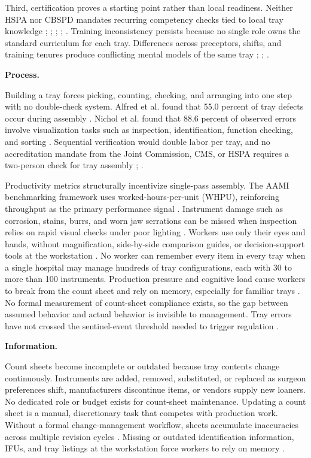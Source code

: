 \documentclass[10pt,a4paper]{article}
\begin{document}
Third, certification proves a starting point rather than local readiness.
Neither HSPA nor CBSPD mandates recurring competency checks tied to local tray
knowledge
\cite{hspa-crcst-accessed-2026};
\cite{ofstead-et-al-2023};
\cite{aorn-staffing-shortage-2025};
\cite{kovach-2012};
\cite{nadeau-2017}. Training inconsistency
persists because no single role owns the standard curriculum for each tray.
Differences across preceptors, shifts, and training tenures produce conflicting
mental models of the same tray
\cite{alfred-et-al-2021};
\cite{hu-et-al-2024};
\cite{thurmond-2020}.

\textbf{Process.}

Building a tray forces picking, counting, checking, and arranging into one step
with no double-check system. Alfred et al. found that 55.0 percent of tray
defects occur during assembly
\cite{alfred-et-al-2021}. Nichol et al. found that
88.6 percent of observed errors involve visualization tasks such as inspection,
identification, function checking, and sorting
\cite{nichol-et-al-2024}. Sequential
verification would double labor per tray, and no accreditation mandate from the
Joint Commission, CMS, or HSPA requires a two-person check for tray assembly
\cite{alfred-et-al-2021};
\cite{chen-et-al-2023}.

Productivity metrics structurally incentivize single-pass assembly. The AAMI
benchmarking framework uses worked-hours-per-unit (WHPU), reinforcing throughput
as the primary performance signal
\cite{kusler-jensen-spd-benchmarking-2023}.
Instrument damage such as corrosion, stains, burrs, and worn jaw serrations can
be missed when inspection relies on rapid visual checks under poor lighting
\cite{lind-2026a}. Workers use only their eyes and hands, without magnification,
side-by-side comparison guides, or decision-support tools at the workstation
\cite{nichol-et-al-2024}. No worker can remember every item in every tray when a
single hospital may manage hundreds of tray configurations, each with 30 to more
than 100 instruments. Production pressure and cognitive load cause workers to
break from the count sheet and rely on memory, especially for familiar trays
\cite{nadeau-2024}. No formal measurement of count-sheet compliance exists, so
the gap between assumed behavior and actual behavior is invisible to management.
Tray errors have not crossed the sentinel-event threshold needed to trigger
regulation \cite{joint-commission-sentinel-event-2024}.

\textbf{Information.}

Count sheets become incomplete or outdated because tray contents change
continuously. Instruments are added, removed, substituted, or replaced as
surgeon preferences shift, manufacturers discontinue items, or vendors supply
new loaners. No dedicated role or budget exists for count-sheet maintenance.
Updating a count sheet is a manual, discretionary task that competes with
production work. Without a formal change-management workflow, sheets accumulate
inaccuracies across multiple revision cycles
\cite{nadeau-2024}. Missing or
outdated identification information, IFUs, and tray listings at the workstation
force workers to rely on memory \cite{lind-2025}.
\end{document}
